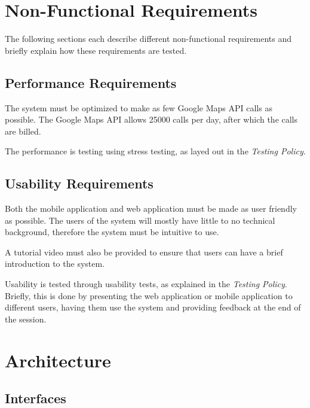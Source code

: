 \documentclass{article}
\begin{document}
    \newpage


    \section{Non-Functional Requirements}

    The following sections each describe different non-functional requirements
    and briefly explain how these requirements are tested.

    \subsection{Performance Requirements}

    The system must be optimized to make as few Google Maps API calls as
    possible. The Google Maps API allows 25000 calls per day, after which the
    calls are billed.

    The performance is testing using stress testing, as layed out in the
    \textit{Testing Policy}.

    \subsection{Usability Requirements}

    Both the mobile application and web application must be made as user friendly
    as possible. The users of the system will mostly have little to no technical
    background, therefore the system must be intuitive to use.

    A tutorial video must also be provided to ensure that users can have a brief
    introduction to the system.

    Usability is tested through usability tests, as explained in the
    \textit{Testing Policy}. Briefly, this is done by presenting the web
    application or mobile application to different users, having them use the
    system and providing feedback at the end of the session.

    \newpage


    \section{Architecture}

    \subsection{Interfaces}
\end{document}
